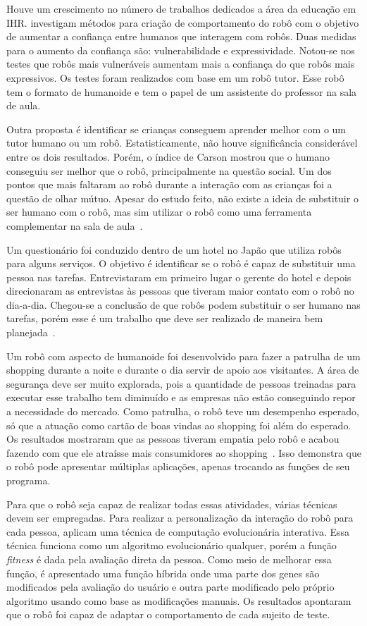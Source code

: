 Houve um crescimento no número de trabalhos dedicados a área da educação em IHR. \textcite{martelaro:2016} investigam métodos para criação de comportamento do robô com o objetivo de aumentar a confiança entre humanos que interagem com robôs. Duas medidas para o aumento da confiança são: vulnerabilidade e expressividade. Notou-se nos testes que robôs mais vulneráveis aumentam mais a confiança do que robôs mais expressivos. Os testes foram realizados com base em um robô tutor. Esse robô tem o formato de humanoide e tem o papel de um assistente do professor na sala de aula.

Outra proposta é identificar se crianças conseguem aprender melhor com o um tutor humano ou um robô. Estatisticamente, não houve significância considerável entre os dois resultados. Porém, o índice de Carson mostrou que o humano conseguiu ser melhor que o robô, principalmente na questão social. Um dos pontos que mais faltaram ao robô durante a interação com as crianças foi a questão de olhar mútuo. Apesar do estudo feito, não existe a ideia de substituir o ser humano com o robô, mas sim utilizar o robô como uma ferramenta complementar na sala de aula~\cite{kennedy:2016}.

Um questionário foi conduzido dentro de um hotel no Japão que utiliza robôs para alguns serviços. O objetivo é identificar se o robô é capaz de substituir uma pessoa nas tarefas. Entrevistaram em primeiro lugar o gerente do hotel e depois direcionaram as entrevistas às pessoas que tiveram maior contato com o robô no dia-a-dia. Chegou-se a conclusão de que robôs podem substituir o ser humano nas tarefas, porém esse é um trabalho que deve ser realizado de maneira bem planejada~\cite{osawa:2017}.

Um robô com aspecto de humanoide foi desenvolvido para fazer a patrulha de um shopping durante a noite e durante o dia servir de apoio aos visitantes. A área de segurança deve ser muito explorada, pois a quantidade de pessoas treinadas para executar esse trabalho tem diminuído e as empresas não estão conseguindo repor a necessidade do mercado. Como patrulha, o robô teve um desempenho esperado, só que a atuação como cartão de boas vindas ao shopping foi além do esperado. Os resultados mostraram que as pessoas tiveram empatia pelo robô e acabou fazendo com que ele atraísse mais consumidores ao shopping~\cite{lopez:2017}. Isso demonstra que o robô pode apresentar múltiplas aplicações, apenas trocando as funções de seu programa.

Para que o robô seja capaz de realizar todas essas atividades, várias técnicas devem ser empregadas. Para realizar a personalização da interação do robô para cada pessoa, \textcite{suga:2006} aplicam uma técnica de computação evolucionária interativa. Essa técnica funciona como um algoritmo evolucionário qualquer, porém a função \emph{fitness} é dada pela avaliação direta da pessoa. Como meio de melhorar essa função, é apresentado uma função híbrida onde uma parte dos genes são modificados pela avaliação do usuário e outra parte modificado pelo próprio algoritmo usando como base as modificações manuais. Os resultados apontaram que o robô foi capaz de adaptar o comportamento de cada sujeito de teste.

